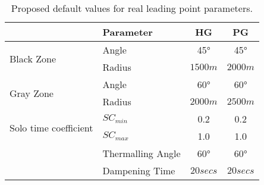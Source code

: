 \documentclass[gap.tex]{subfiles}
\begin{document}
\begin{table}[!ht]
    \begin{tabularx}{\textwidth}{|l|X|c|c|}
    \hline
        & \textbf{Parameter}
        & \textbf{HG}
        & \textbf{PG}
        \\
    \hline
        \multirow{2}{*}{Black Zone}
        & Angle
        & 45°
        & 45°
        \\
    \cline{2-4}
        & Radius
        & $1500 m$
        & $2000 m$
        \\
    \hline
        \multirow{2}{*}{Gray Zone}
        & Angle
        & 60°
        & 60°
        \\
    \cline{2-4}
        & Radius
        & $2000 m$
        & $2500 m$
        \\
    \hline
        \multirow{2}{*}{Solo time coefficient}
        & $SC_{min}$
        & 0.2
        & 0.2
        \\
    \cline{2-4}
        & $SC_{max}$
        & 1.0
        & 1.0
        \\
    \hline
        \multirow{3}{*}{}
        & Thermalling Angle
        & 60°
        & 60°
        \\
    \cline{2-4}
        & Dampening Time
        & $20 secs$
        & $20 secs$
        \\
    \hline
    \end{tabularx}
    \caption{Proposed default values for real leading point parameters.}
    \label{tab:gap-defaults}
\end{table}
\end{document}
